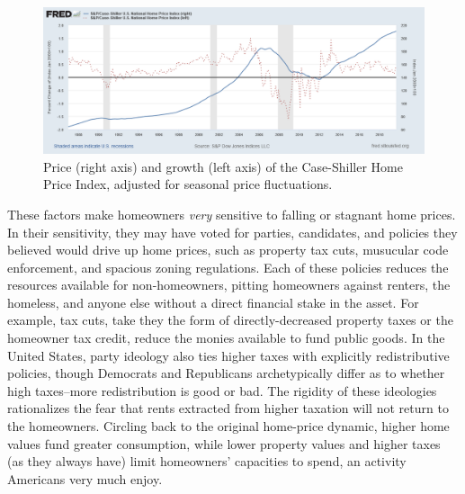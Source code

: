 \documentclass[
]{article}
\begin{document}
\begin{figure}

{\centering \includegraphics[width=0.9\linewidth]{figure/caseshiller_1990_2018} 

}

\caption{Price (right axis) and growth (left axis) of the Case-Shiller Home Price Index, adjusted for seasonal price fluctuations.}\label{fig:caseshiller}
\end{figure}

These factors make homeowners \emph{very} sensitive to falling or
stagnant home prices. In their sensitivity, they may have voted for
parties, candidates, and policies they believed would drive up home
prices, such as property tax cuts, musucular code enforcement, and
spacious zoning regulations. Each of these policies reduces the
resources available for non-homeowners, pitting homeowners against
renters, the homeless, and anyone else without a direct financial stake
in the asset. For example, tax cuts, take they the form of
directly-decreased property taxes or the homeowner tax credit, reduce
the monies available to fund public goods. In the United States, party
ideology also ties higher taxes with explicitly redistributive policies,
though Democrats and Republicans archetypically differ as to whether
high taxes--more redistribution is good or bad. The rigidity of these
ideologies rationalizes the fear that rents extracted from higher
taxation will not return to the homeowners. Circling back to the
original home-price dynamic, higher home values fund greater
consumption, while lower property values and higher taxes (as they
always have) limit homeowners' capacities to spend, an activity
Americans very much enjoy.
\end{document}
